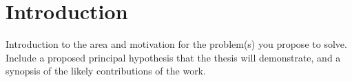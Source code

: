 \section{Introduction}
Introduction to the area and motivation for the problem(s) you
propose to solve.  Include a proposed principal hypothesis that the
thesis will demonstrate, and a synopsis of the likely contributions of
the work.